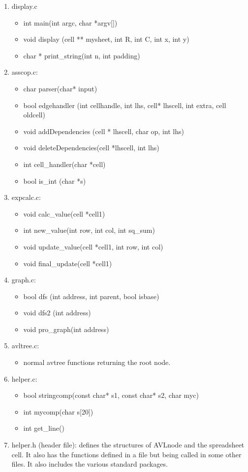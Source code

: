 \documentclass[a4paper]{article}
\begin{document}
\begin{enumerate}
    \item display.c
    \begin{itemize}
        \item int main(int argc, char *argv[])
        \item void display (cell ** mysheet, int R, int C, int x, int y)
        \item char * print\_string(int n, int padding)
    \end{itemize}
    \item asscop.c:
    \begin{itemize}
        \item char parser(char* input)
        \item bool edgehandler (int cellhandle, int lhs, cell* lhscell, int extra, cell oldcell)
        \item void addDependencies (cell * lhscell, char op, int lhs)
        \item void deleteDependencies(cell *lhscell, int lhs)
        \item int cell\_handler(char *cell)
        \item bool is\_int (char *s)
    \end{itemize}
    \item expcalc.c:
    \begin{itemize}
        \item void calc\_value(cell *cell1)
        \item int new\_value(int row, int col, int sq\_sum)
        \item void update\_value(cell *cell1, int row, int col)
        \item void final\_update(cell *cell1)
    \end{itemize}
    \item graph.c:
    \begin{itemize}
        \item bool dfs (int address, int parent, bool isbase)
        \item void dfs2 (int address)
        \item void pro\_graph(int address)
    \end{itemize}
    \item avltree.c:
    \begin{itemize}
        \item normal avtree functions returning the root node.
    \end{itemize}
    \item helper.c:
    \begin{itemize}
        \item bool stringcomp(const char* s1, const char* s2, char myc)
        \item int mycomp(char s[20])
        \item int get\_line()
    \end{itemize}
    \item helper.h (header file): defines the structures of AVLnode and the spreadsheet cell. It also has the functions defined in a file but being called in some other files. It also includes the various standard packages.
        

\end{enumerate}
\end{document}
